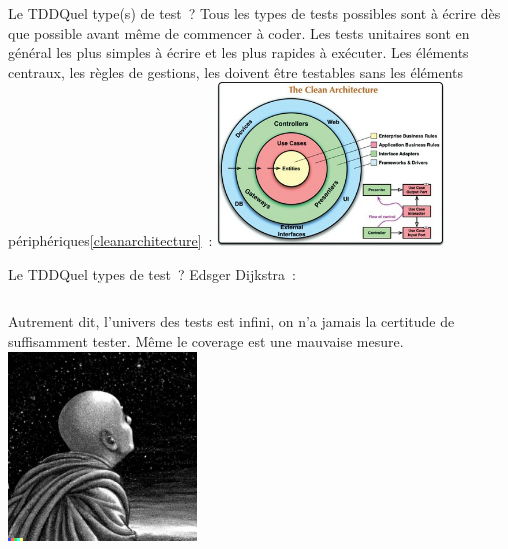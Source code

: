 \documentclass{beamer}
\begin{document}
    \begin{frame}{Le TDD}{Quel type(s) de test~?}
        Tous les types de tests possibles sont à écrire dès que possible avant même de commencer à coder.
        Les tests unitaires sont en général les plus simples à écrire et les plus rapides à exécuter.
        \bigbreak
        Les éléments centraux, les règles de gestions, les  doivent être testables sans les éléments périphériques\cref{cleanarchitecture}~:
        \bigbreak
        \centering
        \includegraphics[width=6cm]{image/the-clean-architecture}
    \end{frame}

    \begin{frame}{Le TDD}{Quel types de test~?}
        Edsger Dijkstra~: 
        \bigbreak
        \begin{columns}
            Autrement dit, l'univers des tests est infini, on n'a jamais la certitude de suffisamment tester.
            \bigbreak
            Même le coverage est une mauvaise mesure.
            \centering
            \includegraphics[width=5cm]{image/monk-looking-the-deepness-of-the-stars-in-the-night-sky}
        \end{columns}
    \end{frame}
\end{document}
